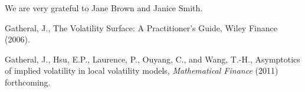\documentclass[12pt]{article}
\numberwithin{equation}{section}
\begin{document}
We are very grateful to Jane Brown and Janice Smith.

%
%
%
%

\begin{thebibliography}{}


 { Gatheral, J.},
{The Volatility Surface: A Practitioner's Guide},
{Wiley Finance} (2006).

{ Gatheral, J.}, { Hsu, E.P.}, { Laurence, P.}, { Ouyang, C.}, and { Wang, T.-H.},
{Asymptotics of implied volatility in local volatility models},
{\it Mathematical Finance} (2011) forthcoming.



\end{thebibliography}
\end{document}

